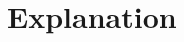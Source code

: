 \documentclass[journal,12pt,twocolumn]{IEEEtran}
\begin{document}
\section{Explanation}
%

%
\end{document}
